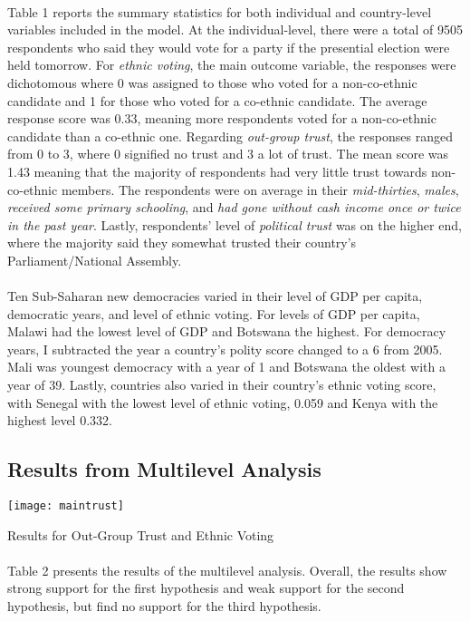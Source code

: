 \documentclass[a4paper, 12pt]{article}
\begin{document}
\paragraph{}
Table 1 reports the summary statistics for both individual and country-level variables included in the model. At the individual-level, there were a total of 9505 respondents who said they would vote for a party if the presential election were held tomorrow. For \textit{ethnic voting}, the main outcome variable, the responses were dichotomous where 0 was assigned to those who voted for a non-co-ethnic candidate and 1 for those who voted for a co-ethnic candidate. The average response score was 0.33, meaning more respondents voted for a non-co-ethnic candidate than a co-ethnic one. Regarding \textit{out-group trust}, the responses ranged from 0 to 3, where 0 signified no trust and 3 a lot of trust. The mean score was 1.43 meaning that the majority of respondents had very little trust towards non-co-ethnic members. The respondents were on average in their \textit{mid-thirties}, \textit{males}, \textit{received some primary schooling}, and \textit{had gone without cash income once or twice in the past year}. Lastly, respondents' level of \textit{political trust} was on the higher end, where the majority said they somewhat trusted their country's Parliament/National Assembly.
\paragraph{}
Ten Sub-Saharan new democracies varied in their level of GDP per capita, democratic years, and level of ethnic voting. For levels of GDP per capita, Malawi had the lowest level of GDP and Botswana the highest. For democracy years, I subtracted the year a country's polity score changed to a 6 from 2005. Mali was youngest democracy with a year of 1 and Botswana the oldest with a year of 39. Lastly, countries also varied in their country's ethnic voting score, with Senegal with the lowest level of ethnic voting, 0.059 and Kenya with the highest level 0.332.

\subsection{Results from Multilevel Analysis}
\begin{table}[H]
	\centering
	\texttt{[image: maintrust]}
	\caption{Results for Out-Group Trust and Ethnic Voting}
\end{table}
\paragraph{}
Table 2 presents the results of the multilevel analysis. Overall, the results show strong support for the first hypothesis and weak support for the second hypothesis, but find no support for the third hypothesis.
\end{document}
